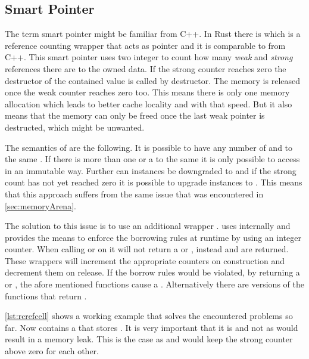 \documentclass[thesis]{subfiles}
\begin{document}
  \subsection{Smart Pointer}
    The term smart pointer might be familiar from C++.
    In Rust there is \RcT which is a reference counting wrapper that acts as pointer and it is comparable to  from C++.
    This smart pointer uses two integer to count how many \emph{weak} and \emph{strong} references there are to the owned data.
    If the strong counter reaches zero the destructor of the contained value is called by \RcTs destructor.
    The memory is released once the weak counter reaches zero too.
    This means there is only one memory allocation which leads to better cache locality and with that speed.
    But it also means that the memory can only be freed once the last weak pointer is destructed, which might be unwanted.
    \autocite[std::rc::Rc]{rust-doc}

    The semantics of \RcT are the following.
    It is possible to have any number of \RcTs and \WeakTs to the same \T.
    If there is more than one \RcT or a \WeakT to the same \T it is only possible to access \T in an immutable way.
    Further can \RcT instances be downgraded to \WeakT and if the strong count has not yet reached zero it is possible to upgrade \WeakT instances to \RcT.
    This means that this approach suffers from the same issue that was encountered in \autoref{sec:memoryArena}.\autocite[std::rc::Rc]{rust-doc}

    The solution to this issue is to use an additional wrapper \RcRefCellT.
    \RefCellT uses internally  and provides the means to enforce the borrowing rules at runtime by using an integer counter.
    When calling  or  on \RefCellT it will not return a  or , instead \RefT and \RefMutT are returned.
    These wrappers will increment the appropriate counters on construction and decrement them on release.
    If the borrow rules would be violated, by returning a \RefT or \RefMutT, the afore mentioned functions cause a \panic.
    Alternatively there are  versions of the functions that return .\autocite[std::cell::RefCell]{rust-doc}


    \autoref{lst:rcrefcell} shows a working example that solves the encountered problems so far.
    Now \Node contains a  that stores \WeakT.
    It is very important that it is \WeakT and not \RcT as \RcT would result in a memory leak.
    This is the case as  and  would keep the strong counter above zero for each other.
\end{document}
